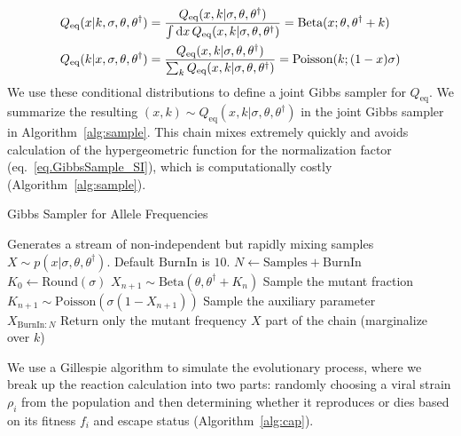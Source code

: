 \documentclass[11pt]{article}
\renewcommand{\d}{{\text d}}
\newcommand{\eq}{{\text{eq}}}
\newcommand{\CommentG}[1]{{\color{gray}\Comment #1}}
\begin{document}
\begin{align}
Q_\eq(x | k, \sigma,\theta,\theta^\dagger) &= \frac{Q_\eq(x,k |\sigma,\theta,\theta^\dagger)}{\int \d x \, Q_\eq(x,k |\sigma,\theta,\theta^\dagger)} =  \text{Beta}(x; \theta , \theta^\dagger+k)\\
Q_\eq(k | x, \sigma,\theta,\theta^\dagger) &= \frac{Q_\eq(x,k |\sigma,\theta,\theta^\dagger)}{\sum_k Q_\eq(x,k |\sigma,\theta,\theta^\dagger)} =  \text{Poisson}(k ;(1-x) \sigma)
 \label{eq.GibbsSample_SI}
\end{align}
We use these conditional distributions to define a joint Gibbs sampler for $Q_\eq$.
We summarize the resulting $(x,k) \sim Q_\eq(x,k |\sigma,\theta,\theta^\dagger)$ in the joint Gibbs sampler in Algorithm~\ref{alg:sample}. This chain mixes extremely quickly and avoids calculation of the hypergeometric function for the normalization factor (eq.~\ref{eq.GibbsSample_SI}), which is computationally costly (Algorithm~\ref{alg:sample}).

\begin{algorithm}[h!]
\caption{Gibbs Sampler for Allele Frequencies}\label{alg:sample}
\begin{algorithmic}
\CommentG{Generates a stream of non-independent but rapidly mixing samples $X \sim p(x|\sigma, \theta, \theta^{\dagger})$. Default $\text{BurnIn}$ is $10$.}
\State $N \gets \text{Samples} + \text{BurnIn}$
\State $K_0 \gets \text{Round}(\sigma)$
\State $X_{n+1} \sim \text{Beta}(\theta, \theta^\dagger+K_{n})$ \CommentG{Sample the mutant fraction}
\State $K_{n+1} \sim \text{Poisson}(\sigma (1-X_{n+1}))$ \CommentG{Sample the auxiliary parameter} 
\EndFor \\
\Return $X_{\text{BurnIn} : N}$ \CommentG{Return only the mutant frequency $X$ part of the chain (marginalize over $k$)}
\EndProcedure
\end{algorithmic}
\end{algorithm}

We use a Gillespie algorithm to simulate the evolutionary process, where we break up the reaction calculation into two parts: randomly choosing a viral strain $\rho_i$ from the population and then determining whether it reproduces or dies based on its fitness $f_i$ and escape status (Algorithm~\ref{alg:cap}). %
\end{document}
